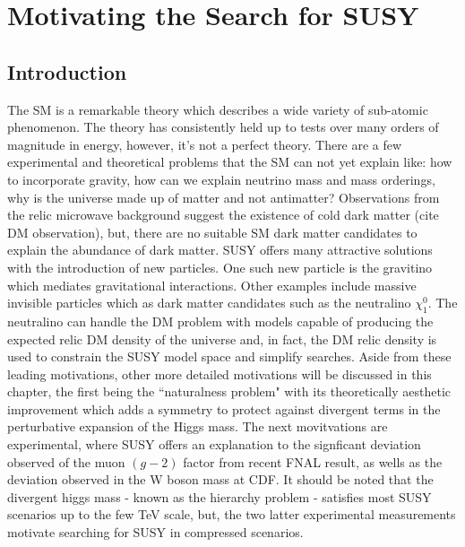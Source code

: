 
\setcounter{secnumdepth}{3}
\setcounter{tocdepth}{3}

\setlength{\parindent}{1 em}


\makeatother


\chapter{Motivating the Search for SUSY}


\section{Introduction}

The SM is a remarkable theory which describes a wide variety of sub-atomic phenomenon. The theory has consistently held up to tests over many orders of magnitude in energy, however, it's not a perfect theory. There are a few  experimental and theoretical problems that the SM can not yet explain like: how to incorporate gravity,  how can we explain neutrino mass and mass orderings, why is the universe made up of matter and not antimatter?   Observations from the relic microwave background suggest the existence of cold dark matter (cite DM observation), but, there are no suitable SM dark matter candidates to explain the abundance of dark matter. SUSY offers many attractive solutions with the introduction of new particles. One such new particle is the gravitino which mediates gravitational interactions. Other examples include  massive invisible particles which as dark matter candidates such as the neutralino $\chi_1^0$. The neutralino can handle the DM problem with models capable of producing the expected relic DM density of the universe and, in fact, the DM relic density is used to constrain the SUSY model space and simplify searches. Aside from these leading motivations, other more detailed motivations will be discussed in this chapter, the first being the ``naturalness problem" with its theoretically aesthetic improvement which adds a symmetry to protect against divergent terms in the perturbative expansion of the Higgs mass. The next movitvations are experimental, where SUSY offers an explanation to the signficant deviation observed of the muon $(g-2)$ factor from recent FNAL result, as wells as the deviation observed in the W boson mass at CDF. It should be noted that the divergent higgs mass - known as the hierarchy problem - satisfies most SUSY scenarios up to the few TeV scale, but, the two latter experimental measurements motivate searching for SUSY in compressed scenarios.



